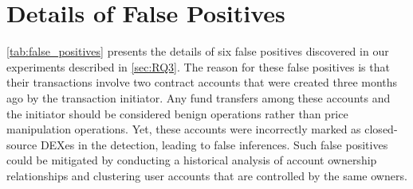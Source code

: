 \section{Details of False Positives}
\label{sec:fp_details}
\mytab\ref{tab:false_positives} presents the details of six false positives discovered in our experiments described in \mysec\ref{sec:RQ3}.
The reason for these false positives is that their transactions involve two contract accounts that were created three months ago by the transaction initiator. 
Any fund transfers among these accounts and the initiator should be considered benign operations rather than price manipulation operations. 
{Yet, these accounts were incorrectly marked as closed-source DEXes in the detection, leading to false inferences.} 
Such false positives could be mitigated by conducting a historical analysis of account ownership relationships and clustering user accounts that are controlled by the same owners.






